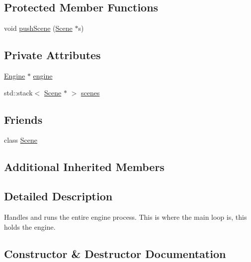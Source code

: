 \subsection*{Protected Member Functions}
\begin{DoxyCompactItemize}
\item 
void \hyperlink{classpcs_1_1Application_ab840614431c7ad54bf09b684a07dba7e}{push\+Scene} (\hyperlink{classpcs_1_1Scene}{Scene} $\ast$s)
\end{DoxyCompactItemize}
\subsection*{Private Attributes}
\begin{DoxyCompactItemize}
\item 
\hyperlink{classpcs_1_1Engine}{Engine} $\ast$ \hyperlink{classpcs_1_1Application_a5d8a72ebc58019f9351926e04e079606}{engine}
\item 
std\+::stack$<$ \hyperlink{classpcs_1_1Scene}{Scene} $\ast$ $>$ \hyperlink{classpcs_1_1Application_afcc3279afd80bbe29841a54078401ce5}{scenes}
\end{DoxyCompactItemize}
\subsection*{Friends}
\begin{DoxyCompactItemize}
\item 
class \hyperlink{classpcs_1_1Application_a032858ae1fe02d2d1170981c2af2d67c}{Scene}
\end{DoxyCompactItemize}
\subsection*{Additional Inherited Members}


\subsection{Detailed Description}
Handles and runs the entire engine process. This is where the main loop is, this holds the engine. 

\subsection{Constructor \& Destructor Documentation}
\mbox{\label{classpcs_1_1Application_ad6c3666170e75e512603b3393c63ebd6}} 

